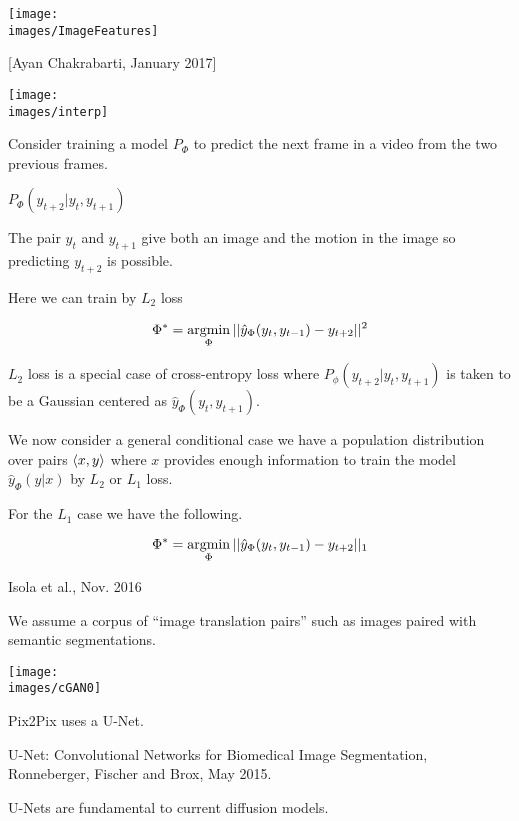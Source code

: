 {\centerline{\texttt{[image: \\images/ImageFeatures]}}


[Ayan Chakrabarti, January 2017]

\centerline{\texttt{[image: \\images/interp]}}


Consider training a model $P_\Phi$ to predict the next frame in a video from the two previous frames.

\vfill
$P_\Phi(y_{t+2}|y_t,y_{t+1})$

\vfill
The pair $y_t$ and $y_{t+1}$ give both an image and the motion in the image so predicting
$y_{t+2}$ is possible.


Here we can train by $L_2$ loss

$$\Phi^* = \operatorname*{argmin}_\Phi ||\hat{y}_\Phi(y_t,y_{t-1}) - y_{t+2}||^2$$

\vfill
$L_2$ loss is a special case of cross-entropy loss where $P_\phi(y_{t+2}|y_t,y_{t+1})$ is taken to be a Gaussian centered as
$\hat{y}_\Phi(y_t,y_{t+1})$.



We now consider a general conditional case we have a population distribution over pairs ${\mbox{$\langle x,y\rangle$}}$
where $x$ provides enough information to train the model $\hat{y}_\Phi(y|x)$ by $L_2$ or $L_1$ loss.

\vfill
For the $L_1$ case we have the following.

\vfill
$$\Phi^* = \operatorname*{argmin}_\Phi ||\hat{y}_\Phi(y_t,y_{t-1}) - y_{t+2}||_1$$

{Isola et al., Nov. 2016}

We assume a corpus of ``image translation pairs'' such as images paired with semantic segmentations.

\centerline{\texttt{[image: \\images/cGAN0]}}


Pix2Pix uses a U-Net.

\vfill
U-Net: Convolutional Networks for Biomedical Image Segmentation, Ronneberger, Fischer and Brox, May 2015.

\vfill
U-Nets are fundamental to current diffusion models.


}
